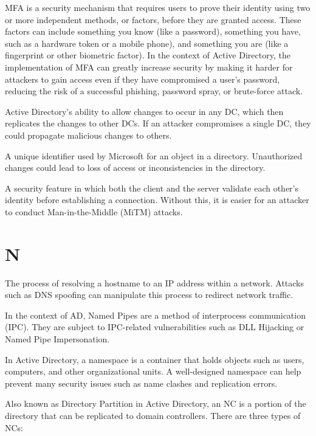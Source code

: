  MFA is a security mechanism that requires users to prove their identity using two or more independent methods, or factors, before they are granted access. These factors can include something you know (like a password), something you have, such as a hardware token or a mobile phone), and something you are (like a fingerprint or other biometric factor). In the context of Active Directory, the implementation of MFA can greatly increase security by making it harder for attackers to gain access even if they have compromised a user’s password, reducing the risk of a successful phishing, password spray, or brute-force attack.

 Active Directory’s ability to allow changes to occur in any DC, which then replicates the changes to other DCs. If an attacker compromises a single DC, they could propagate malicious changes to others.

 A unique identifier used by Microsoft for an object in a directory. Unauthorized changes could lead to loss of access or inconsistencies in the directory.

 A security feature in which both the client and the server validate each other’s identity before establishing a connection. Without this, it is easier for an attacker to conduct Man-in-the-Middle (MiTM) attacks.

\section{N}
 The process of resolving a hostname to an IP address within a network. Attacks such as DNS spoofing can manipulate this process to redirect network traffic.

 In the context of AD, Named Pipes are a method of interprocess communication (IPC). They are subject to IPC-related vulnerabilities such as DLL Hijacking or Named Pipe Impersonation.

 In Active Directory, a namespace is a container that holds objects such as users, computers, and other organizational units. A well-designed namespace can help prevent many security issues such as name clashes and replication errors.

 Also known as Directory Partition in Active Directory, an NC is a portion of the directory that can be replicated to domain controllers. There are three types of NCs:

